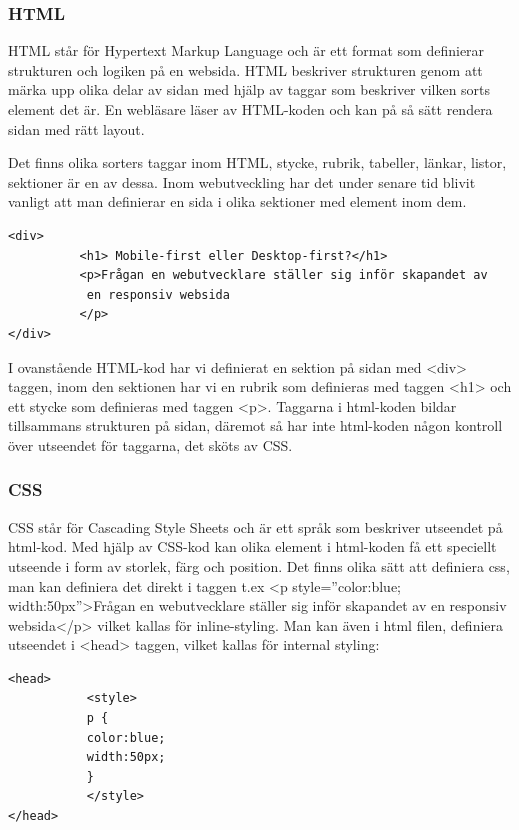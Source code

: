 \documentclass[11pt]{article}
\begin{document}
\subsubsection{HTML}
HTML står för Hypertext Markup Language och är ett format som definierar strukturen och logiken på en websida. HTML beskriver strukturen genom att märka upp olika delar av sidan med hjälp av taggar som beskriver vilken sorts element det är. En webläsare läser av HTML-koden och kan på så sätt rendera sidan med rätt layout.

Det finns olika sorters taggar inom HTML, stycke, rubrik, tabeller, länkar, listor, sektioner är en av dessa. Inom webutveckling har det under senare tid blivit vanligt att man definierar en sida i olika sektioner med element inom dem. 

\vspace{1cm}
\begin{verbatim}
<div> 
          <h1> Mobile-first eller Desktop-first?</h1>
          <p>Frågan en webutvecklare ställer sig inför skapandet av
           en responsiv websida
          </p>
</div>
\end{verbatim}
\vspace{1cm}

I ovanstående HTML-kod har vi definierat en sektion på sidan med <div> taggen, inom den sektionen har vi en rubrik som definieras med taggen <h1> och ett stycke som definieras med taggen <p>. Taggarna i html-koden bildar tillsammans strukturen på sidan, däremot så har inte html-koden någon kontroll över utseendet för taggarna, det sköts av CSS.  

\subsubsection{CSS}
CSS står för Cascading Style Sheets och är ett språk som beskriver utseendet på html-kod.
Med hjälp av CSS-kod kan olika element i html-koden få ett speciellt utseende i form av storlek, färg och position. Det finns olika sätt att definiera css, man kan definiera det direkt i taggen t.ex <p style=”color:blue; width:50px”>Frågan en webutvecklare ställer sig inför skapandet av en responsiv websida</p> vilket kallas för inline-styling. Man kan även i html filen, definiera utseendet i <head> taggen, vilket kallas för internal styling:

\vspace{0.5cm}
\begin{verbatim}
<head>
           <style>
           p {
           color:blue;
           width:50px;
           }
           </style>
</head>
\end{verbatim}
\vspace{0.5cm}
\end{document}
